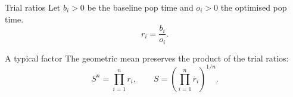 \documentclass[aspectratio=169]{beamer}
\begin{document}
\begin{frame}{Trial ratios}
  Let $b_i>0$ be the baseline pop time and $o_i>0$ the optimised pop time.
  \[r_i=\frac{b_i}{o_i}.\]
\end{frame}
\begin{frame}{A typical factor}
  The geometric mean preserves the product of the trial ratios:
  \[S^n=\prod_{i=1}^n r_i,\qquad S=\left(\prod_{i=1}^n r_i\right)^{1/n}.\]
\end{frame}
\end{document}
